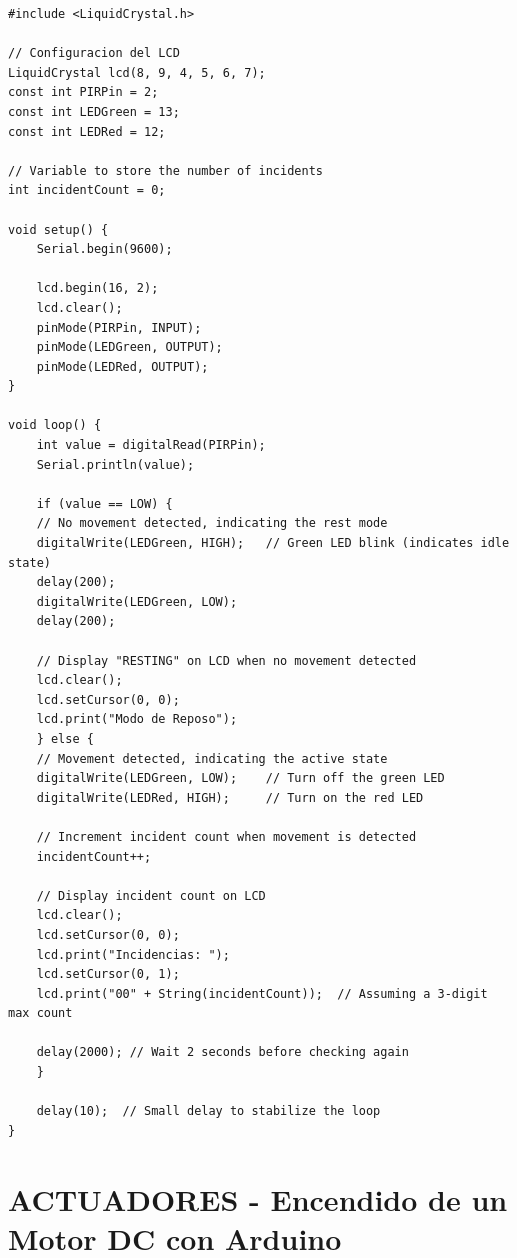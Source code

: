 \begin{lstlisting}[style=cppstyle, caption={Código en C++ para el sistema de control de aforo.}, label={code:sensor_ambiental}]
#include <LiquidCrystal.h>

// Configuracion del LCD
LiquidCrystal lcd(8, 9, 4, 5, 6, 7);
const int PIRPin = 2;
const int LEDGreen = 13;
const int LEDRed = 12;

// Variable to store the number of incidents
int incidentCount = 0;

void setup() {
    Serial.begin(9600);
    
    lcd.begin(16, 2);
    lcd.clear();
    pinMode(PIRPin, INPUT);
    pinMode(LEDGreen, OUTPUT);
    pinMode(LEDRed, OUTPUT);
}

void loop() {
    int value = digitalRead(PIRPin);
    Serial.println(value);

    if (value == LOW) {
    // No movement detected, indicating the rest mode
    digitalWrite(LEDGreen, HIGH);   // Green LED blink (indicates idle state)
    delay(200);
    digitalWrite(LEDGreen, LOW);
    delay(200);
    
    // Display "RESTING" on LCD when no movement detected
    lcd.clear();
    lcd.setCursor(0, 0);
    lcd.print("Modo de Reposo");
    } else {
    // Movement detected, indicating the active state
    digitalWrite(LEDGreen, LOW);    // Turn off the green LED
    digitalWrite(LEDRed, HIGH);     // Turn on the red LED

    // Increment incident count when movement is detected
    incidentCount++;

    // Display incident count on LCD
    lcd.clear();
    lcd.setCursor(0, 0);
    lcd.print("Incidencias: ");
    lcd.setCursor(0, 1);
    lcd.print("00" + String(incidentCount));  // Assuming a 3-digit max count
    
    delay(2000); // Wait 2 seconds before checking again
    }
    
    delay(10);  // Small delay to stabilize the loop
}    
\end{lstlisting}
    


\section{ACTUADORES - Encendido de un Motor DC con Arduino}

